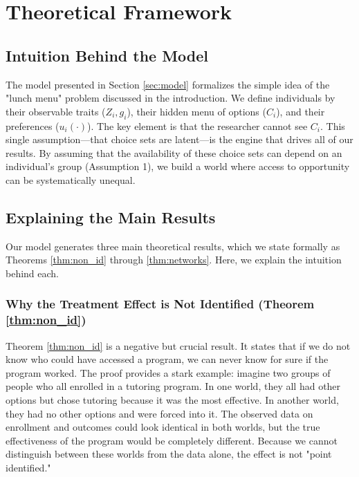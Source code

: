 \section{Theoretical Framework}\label{sec:theory}




\subsection{Intuition Behind the Model}
The model presented in Section \ref{sec:model} formalizes the simple idea of the "lunch menu" problem discussed in the introduction. We define individuals by their observable traits ($Z_i, g_i$), their hidden menu of options ($C_i$), and their preferences ($u_i(\cdot)$). The key element is that the researcher cannot see $C_i$. This single assumption—that choice sets are latent—is the engine that drives all of our results. By assuming that the availability of these choice sets can depend on an individual's group (Assumption 1), we build a world where access to opportunity can be systematically unequal.

\subsection{Explaining the Main Results}
Our model generates three main theoretical results, which we state formally as Theorems \ref{thm:non_id} through \ref{thm:networks}. Here, we explain the intuition behind each.

\subsubsection{Why the Treatment Effect is Not Identified (Theorem \ref{thm:non_id})}
Theorem \ref{thm:non_id} is a negative but crucial result. It states that if we do not know who could have accessed a program, we can never know for sure if the program worked. The proof provides a stark example: imagine two groups of people who all enrolled in a tutoring program. In one world, they all had other options but chose tutoring because it was the most effective. In another world, they had no other options and were forced into it. The observed data on enrollment and outcomes could look identical in both worlds, but the true effectiveness of the program would be completely different. Because we cannot distinguish between these worlds from the data alone, the effect is not "point identified."

